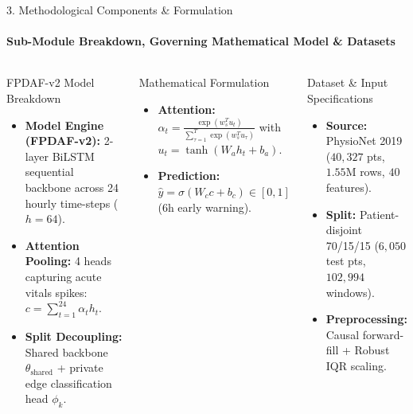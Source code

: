 \documentclass[aspectratio=169, 11pt]{beamer}
\begin{document}
\begin{frame}{3. Methodological Components \& Formulation}
    \framesubtitle{Sub-Module Breakdown, Governing Mathematical Model \& Datasets}
    \begin{columns}[T]
        \begin{block}{FPDAF-v2 Model Breakdown}
            \scriptsize
            \begin{itemize}
                \item \textbf{Model Engine (FPDAF-v2):} 2-layer BiLSTM sequential backbone across 24 hourly time-steps ($h=64$).
                \item \textbf{Attention Pooling:} 4 heads capturing acute vitals spikes: $c = \sum_{t=1}^{24} \alpha_t h_t$.
                \item \textbf{Split Decoupling:} Shared backbone $\theta_{\text{shared}}$ + private edge classification head $\phi_k$.
            \end{itemize}
        \end{block}

        \begin{block}{Mathematical Formulation}
            \scriptsize
            \begin{itemize}
                \item \textbf{Attention:} $\alpha_t = \frac{\exp(w_s^T u_t)}{\sum_{\tau=1}^T \exp(w_s^T u_\tau)}$ with $u_t = \tanh(W_a h_t + b_a)$.
                \item \textbf{Prediction:} $\hat{y} = \sigma(W_c c + b_c) \in [0, 1]$ ($6\text{h}$ early warning).
            \end{itemize}
        \end{block}

        \begin{block}{Dataset \& Input Specifications}
            \scriptsize
            \begin{itemize}
                \item \textbf{Source:} PhysioNet 2019 ($40,327$ pts, $1.55\text{M}$ rows, $40$ features).
                \item \textbf{Split:} Patient-disjoint 70/15/15 ($6,050$ test pts, $102,994$ windows).
                \item \textbf{Preprocessing:} Causal forward-fill + Robust IQR scaling.
            \end{itemize}
        \end{block}


\end{columns}
\end{frame}
\end{document}
